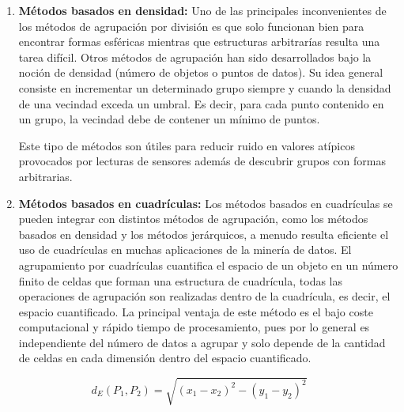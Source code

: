 \begin{enumerate}
    \item \textbf{ Métodos basados en densidad:} Uno de las principales inconvenientes de los métodos de agrupación por división es que solo funcionan bien para encontrar formas esféricas mientras que estructuras arbitrarías resulta una tarea difícil. Otros métodos de agrupación han sido desarrollados bajo la noción de densidad (número de objetos o puntos de datos). Su idea general consiste en incrementar un determinado grupo siempre y cuando la densidad de una vecindad exceda un umbral. Es decir, para cada punto contenido en un grupo, la vecindad debe de contener un mínimo de puntos.
    
    Este tipo de métodos son útiles para reducir ruido en valores atípicos provocados por lecturas de sensores además de descubrir grupos con formas arbitrarias.
    
    \item \textbf{Métodos basados en cuadrículas:} Los métodos basados en cuadrículas se pueden integrar con distintos métodos de agrupación, como los métodos basados en densidad y los métodos jerárquicos, a menudo resulta eficiente el uso de cuadrículas en muchas aplicaciones de la minería de datos. El agrupamiento por cuadrículas cuantifica el espacio de un objeto en un número finito de celdas que forman una estructura de cuadrícula, todas las operaciones de agrupación son realizadas dentro de la cuadrícula, es decir, el espacio cuantificado. La principal ventaja de este método es el bajo coste computacional y rápido tiempo de procesamiento, pues por lo general es independiente del número de datos a agrupar y solo depende de la cantidad de celdas en cada dimensión dentro del espacio cuantificado.
\end{enumerate}

\begin{equation}
    d_E(P_1, P_2) = \sqrt{(x_1 - x_2)^2 - (y_1 - y_2)^2}
    \label{eqn:euclidian_distance}
\end{equation}

